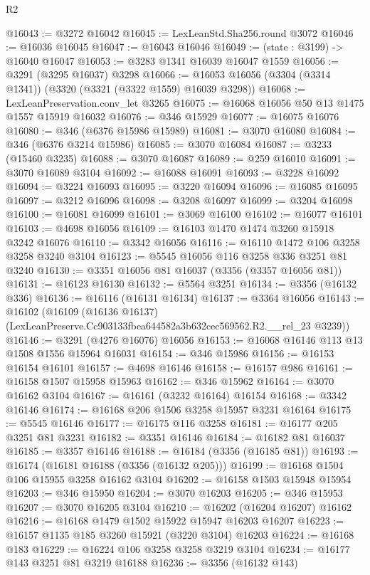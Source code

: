 \begin{lexlean}{R2}
\begin{coremodule}
@16043 := @3272 @16042
@16045 := LexLeanStd.Sha256.round @3072
@16046 := @16036 @16045
@16047 := @16043 @16046
@16049 := (state : @3199) -> @16040 @16047
@16053 := @3283 @1341 @16039 @16047 @1559
@16056 := @3291 (@3295 @16037) @3298
@16066 := @16053 @16056 (@3304 (@3314 @1341)) (@3320 (@3321 (@3322 @1559) @16039 @3298))
@16068 := LexLeanPreservation.conv_let @3265
@16075 := @16068 @16056 @50 @13 @1475 @1557 @15919 @16032
@16076 := @346 @15929
@16077 := @16075 @16076
@16080 := @346 (@6376 @15986 @15989)
@16081 := @3070 @16080
@16084 := @346 (@6376 @3214 @15986)
@16085 := @3070 @16084
@16087 := @3233 (@15460 @3235)
@16088 := @3070 @16087
@16089 := @259 @16010
@16091 := @3070 @16089 @3104
@16092 := @16088 @16091
@16093 := @3228 @16092
@16094 := @3224 @16093
@16095 := @3220 @16094
@16096 := @16085 @16095
@16097 := @3212 @16096
@16098 := @3208 @16097
@16099 := @3204 @16098
@16100 := @16081 @16099
@16101 := @3069 @16100
@16102 := @16077 @16101
@16103 := @4698 @16056
@16109 := @16103 @1470 @1474 @3260 @15918 @3242 @16076
@16110 := @3342 @16056
@16116 := @16110 @1472 @106 @3258 @3258 @3240 @3104
@16123 := @5545 @16056 @116 @3258 @336 @3251 @81 @3240
@16130 := @3351 @16056 @81 @16037 (@3356 (@3357 @16056 @81))
@16131 := @16123 @16130
@16132 := @5564 @3251
@16134 := @3356 (@16132 @336)
@16136 := @16116 (@16131 @16134)
@16137 := @3364 @16056
@16143 := @16102
    (@16109 (@16136 @16137) (LexLeanPreserve.Cc903133fbea644582a3b632cec569562.R2.__rel_23 @3239))
@16146 := @3291 (@4276 @16076) @16056
@16153 := @16068 @16146 @113 @13 @1508 @1556 @15964 @16031
@16154 := @346 @15986
@16156 := @16153 @16154 @16101
@16157 := @4698 @16146
@16158 := @16157 @986
@16161 := @16158 @1507 @15958 @15963
@16162 := @346 @15962
@16164 := @3070 @16162 @3104
@16167 := @16161 (@3232 @16164) @16154
@16168 := @3342 @16146
@16174 := @16168 @206 @1506 @3258 @15957 @3231 @16164
@16175 := @5545 @16146
@16177 := @16175 @116 @3258
@16181 := @16177 @205 @3251 @81 @3231
@16182 := @3351 @16146
@16184 := @16182 @81 @16037
@16185 := @3357 @16146
@16188 := @16184 (@3356 (@16185 @81))
@16193 := @16174 (@16181 @16188 (@3356 (@16132 @205)))
@16199 := @16168 @1504 @106 @15955 @3258 @16162 @3104
@16202 := @16158 @1503 @15948 @15954
@16203 := @346 @15950
@16204 := @3070 @16203
@16205 := @346 @15953
@16207 := @3070 @16205 @3104
@16210 := @16202 (@16204 @16207) @16162
@16216 := @16168 @1479 @1502 @15922 @15947 @16203 @16207
@16223 := @16157 @1135 @185 @3260 @15921 (@3220 @3104) @16203
@16224 := @16168 @183
@16229 := @16224 @106 @3258 @3258 @3219 @3104
@16234 := @16177 @143 @3251 @81 @3219 @16188
@16236 := @3356 (@16132 @143)

\end{coremodule}
\end{lexlean}
